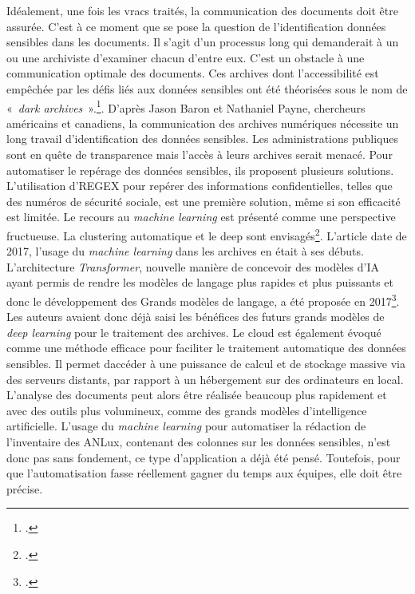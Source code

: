 Idéalement, une fois les vracs traités, la communication des documents doit
être assurée. C'est à ce moment que se pose la question de
l'identification données sensibles dans les documents. Il s'agit d'un
processus long qui demanderait à un ou une archiviste d'examiner chacun
d'entre eux. C'est un obstacle à une communication optimale des documents.
Ces archives dont l'accessibilité est empêchée par les défis liés aux
données sensibles ont été théorisées sous le nom de «~\textit{dark
archives}~».\footcite{baron_dark_2017}. D'après Jason Baron et
Nathaniel Payne, chercheurs américains et canadiens, la communication
des archives numériques nécessite un long travail d'identification des
données sensibles. Les administrations publiques sont en quête de
transparence mais l'accès à leurs archives serait menacé. Pour
automatiser le repérage des données sensibles, ils proposent plusieurs
solutions. L'utilisation d'\gls{REGEX} pour repérer des
informations confidentielles, telles que des numéros de sécurité sociale,
est une première solution, même si son efficacité est limitée. Le
recours au \emph{machine learning} est présenté comme une perspective
fructueuse. La \gls{clustering} automatique et le
\gls{deep} sont
envisagés\footcite{baron_dark_2017}. L'article date de 2017,
l'usage du \emph{machine learning} dans les archives en était à ses
débuts. L'architecture \emph{Transformer}, nouvelle manière de concevoir des
modèles d'IA ayant permis de rendre les modèles de langage plus rapides
et plus puissants et donc le développement des Grands modèles de
langage, a été proposée en 2017\footcite{vaswani_attention_2023}. Les auteurs avaient donc déjà
saisi les bénéfices des futurs grands modèles de \emph{deep learning}
pour le traitement des archives. Le \gls{cloud} est également évoqué comme une méthode
efficace pour faciliter le traitement automatique des données sensibles.
Il permet d\textquotesingle accéder à une puissance de calcul et de
stockage massive via des serveurs distants, par rapport à un
hébergement sur des ordinateurs en local. L'analyse des documents peut
alors être réalisée beaucoup plus rapidement et avec des outils plus
volumineux, comme des grands modèles d'intelligence artificielle.
L'usage du \emph{machine learning} pour automatiser la rédaction de
l'inventaire des ANLux, contenant des colonnes sur les données
sensibles, n'est donc pas sans fondement, ce type d'application a déjà
été pensé. Toutefois, pour que l'automatisation fasse réellement gagner du temps aux équipes, elle doit être précise.\newline

